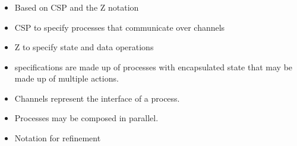 \documentclass{beamer}
\begin{document}
\begin{frame}
  \frametitle{\Circus{}}
  \begin{itemize}
  \item Based on CSP and the Z notation
  \item CSP to specify processes that communicate over channels
  \item Z to specify state and data operations
  \item \Circus{} specifications are made up of processes with encapsulated
    state that may be made up of multiple actions.
  \item Channels represent the interface of a process.
  \item Processes may be composed in parallel.
  \item Notation for refinement
  \end{itemize}
  

\end{frame}
\end{document}
